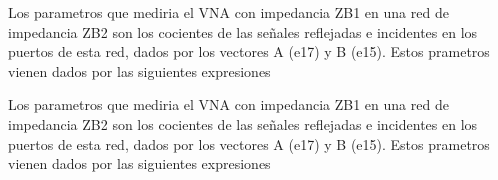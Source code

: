 \documentclass{article}
\begin{document}
\begin{Maple Normal}{
\begin{Maple Normal}{
}\end{Maple Normal}
}\end{Maple Normal}
\begin{maplegroup}
\mapleresult
{}
\end{maplegroup}
\begin{Maple Normal}{
\begin{Maple Normal}{
Los parametros que mediria el VNA con impedancia ZB1 en una red de impedancia ZB2 son los cocientes de las señales reflejadas e incidentes en los puertos de esta red, dados por los vectores A (e17) y B (e15). Estos prametros vienen dados por las siguientes expresiones}\end{Maple Normal}

\begin{Maple Normal}{
Los parametros que mediria el VNA con impedancia ZB1 en una red de impedancia ZB2 son los cocientes de las señales reflejadas e incidentes en los puertos de esta red, dados por los vectores A (e17) y B (e15). Estos prametros vienen dados por las siguientes expresiones}\end{Maple Normal}

}\end{Maple Normal}
\end{document}
